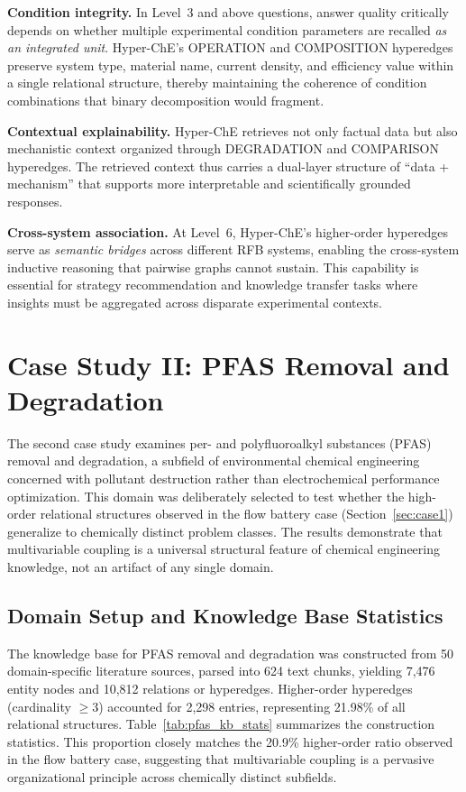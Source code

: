 \documentclass[11pt,a4paper]{article}
\begin{document}
\textbf{Condition integrity.} In Level~3 and above questions, answer quality critically depends on whether multiple experimental condition parameters are recalled \emph{as an integrated unit}. Hyper-ChE's OPERATION and COMPOSITION hyperedges preserve system type, material name, current density, and efficiency value within a single relational structure, thereby maintaining the coherence of condition combinations that binary decomposition would fragment.

\textbf{Contextual explainability.} Hyper-ChE retrieves not only factual data but also mechanistic context organized through DEGRADATION and COMPARISON hyperedges. The retrieved context thus carries a dual-layer structure of ``data + mechanism'' that supports more interpretable and scientifically grounded responses.

\textbf{Cross-system association.} At Level~6, Hyper-ChE's higher-order hyperedges serve as \emph{semantic bridges} across different RFB systems, enabling the cross-system inductive reasoning that pairwise graphs cannot sustain. This capability is essential for strategy recommendation and knowledge transfer tasks where insights must be aggregated across disparate experimental contexts.


\section{Case Study II: PFAS Removal and Degradation}
\label{sec:case2}

The second case study examines per- and polyfluoroalkyl substances (PFAS) removal and degradation, a subfield of environmental chemical engineering concerned with pollutant destruction rather than electrochemical performance optimization. This domain was deliberately selected to test whether the high-order relational structures observed in the flow battery case (Section~\ref{sec:case1}) generalize to chemically distinct problem classes. The results demonstrate that multivariable coupling is a universal structural feature of chemical engineering knowledge, not an artifact of any single domain.

\subsection{Domain Setup and Knowledge Base Statistics}

The knowledge base for PFAS removal and degradation was constructed from 50 domain-specific literature sources, parsed into 624 text chunks, yielding 7,476 entity nodes and 10,812 relations or hyperedges. Higher-order hyperedges (cardinality $\geq 3$) accounted for 2,298 entries, representing 21.98\% of all relational structures. Table~\ref{tab:pfas_kb_stats} summarizes the construction statistics. This proportion closely matches the 20.9\% higher-order ratio observed in the flow battery case, suggesting that multivariable coupling is a pervasive organizational principle across chemically distinct subfields.
\end{document}
